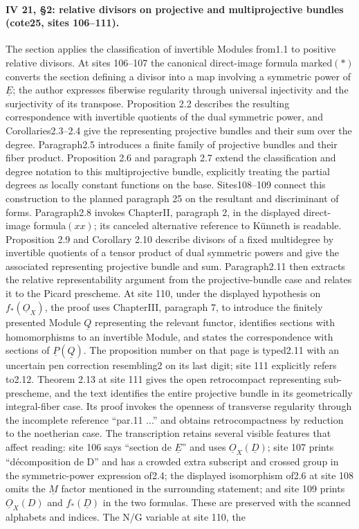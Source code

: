 \documentclass[10pt,a4paper]{article}
\begin{document}
\par{}
\paragraph{IV 21, \S2: relative divisors on projective and multiprojective bundles (cote25, sites 106--111).}
The section applies the classification of invertible Modules from1.1 to positive relative divisors. At sites 106--107 the canonical direct-image formula marked$(*)$ converts the section defining a divisor into a map involving a symmetric power of $\underline E$; the author expresses fiberwise regularity through universal injectivity and the surjectivity of its transpose. Proposition 2.2 describes the resulting correspondence with invertible quotients of the dual symmetric power, and Corollaries2.3--2.4 give the representing projective bundles and their sum over the degree. Paragraph2.5 introduces a finite family of projective bundles and their fiber product. Proposition 2.6 and paragraph 2.7 extend the classification and degree notation to this multiprojective bundle, explicitly treating the partial degrees as locally constant functions on the base. Sites108--109 connect this construction to the planned paragraph 25 on the resultant and discriminant of forms. Paragraph2.8 invokes ChapterII, paragraph 2, in the displayed direct-image formula$(xx)$; its canceled alternative reference to Künneth is readable. Proposition 2.9 and Corollary 2.10 describe divisors of a fixed multidegree by invertible quotients of a tensor product of dual symmetric powers and give the associated representing projective bundle and sum. Paragraph2.11 then extracts the relative representability argument from the projective-bundle case and relates it to the Picard prescheme. At site 110, under the displayed hypothesis on $f_*(\underline O_X)$, the proof uses ChapterIII, paragraph 7, to introduce the finitely presented Module $\underline Q$ representing the relevant functor, identifies sections with homomorphisms to an invertible Module, and states the correspondence with sections of $\underline P(\underline Q)$. The proposition number on that page is typed2.11 with an uncertain pen correction resembling2 on its last digit; site 111 explicitly refers to2.12. Theorem 2.13 at site 111 gives the open retrocompact representing sub-prescheme, and the text identifies the entire projective bundle in its geometrically integral-fiber case. Its proof invokes the openness of transverse regularity through the incomplete reference ``par.11 ...'' and obtains retrocompactness by reduction to the noetherian case. The transcription retains several visible features that affect reading: site 106 says ``section de $\underline E$'' and uses $\underline O_X(\underline D)$; site 107 prints ``décomposition de D'' and has a crowded extra subscript and crossed group in the symmetric-power expression of2.4; the displayed isomorphism of2.6 at site 108 omits the $\underline M$ factor mentioned in the surrounding statement; and site 109 prints $\underline O_X(D)$ and $f_*(\underline D)$ in the two formulas. These are preserved with the scanned alphabets and indices. The N/G variable at site 110, the 
\end{document}
